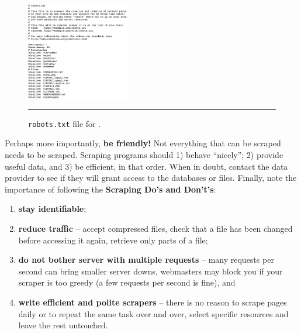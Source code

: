 \begin{figure}[th!]
\centering
\includegraphics[width=0.40\textwidth]{images/DC/CQADS_robots.png}
\caption[\small \texttt{robots.txt} file for a random webpage]{\small \texttt{robots.txt} file for .} \hrule\label{fig:robots}
\end{figure}
\afterpage{\FloatBarrier}
\newl Perhaps more importantly, \textbf{be friendly!} Not everything that can be scraped needs to be scraped. Scraping programs should 1) behave ``nicely''; 2) provide useful data, and 3) be efficient, in that order. When in doubt, contact the data provider to see if they will grant access to the databases or files. 
\newpage\noindent Finally, note the importance of following the \textbf{Scraping Do's and Don't's}:
\begin{enumerate}
    \item \textbf{stay identifiable};
    \item \textbf{reduce traffic} -- accept compressed files, check that a file has been changed before accessing it again, retrieve only parts of a file;
    \item \textbf{do not bother server with multiple requests} --  many requests per second can bring smaller server downs, webmasters may block you if your scraper is too greedy (a few requests per second is fine), and
    \item \textbf{write efficient and polite scrapers} -- there is no reason to scrape pages daily or to repeat the same task over and over, select specific resources and leave the rest untouched. 
\end{enumerate}
